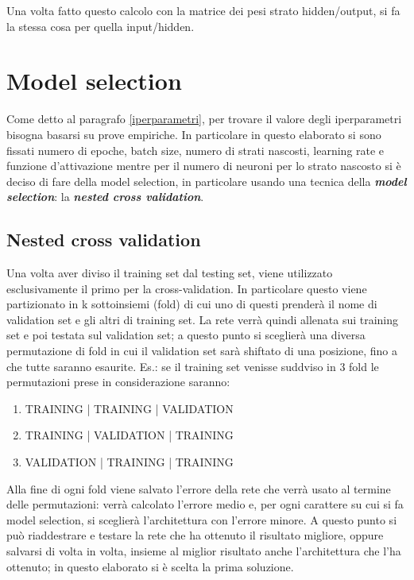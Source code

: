 \documentclass[12pt]{report}
\begin{document}
Una volta fatto questo calcolo con la matrice dei pesi strato hidden/output, si fa la stessa cosa per quella input/hidden.


\section{Model selection}
Come detto al paragrafo \ref{iperparametri}, per trovare il valore degli iperparametri bisogna basarsi su prove empiriche. In particolare in questo elaborato si sono fissati numero di epoche, batch size, numero di strati nascosti, learning rate e funzione d'attivazione mentre per il numero di neuroni per lo strato nascosto si è deciso di fare della model selection, in particolare usando una tecnica della \textbf{\textit{model selection}}: la \textbf{\textit{nested cross validation}}.

\subsection{Nested cross validation}
Una volta aver diviso il training set dal testing set, viene utilizzato esclusivamente  il primo per la cross-validation. In particolare questo viene partizionato in k sottoinsiemi (fold) di cui uno di questi prenderà il nome di validation set e gli altri di training set. La rete verrà quindi allenata sui training set e poi testata sul validation set; a questo punto si sceglierà una diversa permutazione di fold in cui il validation set sarà shiftato di una posizione, fino a che tutte saranno esaurite. 
Es.: se il training set venisse suddviso in 3 fold le permutazioni prese in considerazione saranno:
\begin{enumerate}
\item{TRAINING | TRAINING | VALIDATION}
\item{TRAINING | VALIDATION | TRAINING}
\item{VALIDATION | TRAINING | TRAINING}
\end{enumerate}

Alla fine di ogni fold viene salvato l’errore della rete che verrà usato al termine delle permutazioni: verrà calcolato l’errore medio e, per ogni carattere su cui si fa model selection, si sceglierà l’architettura con l’errore minore. A questo punto si può riaddestrare e testare la rete che ha ottenuto il risultato migliore, oppure salvarsi di volta in volta, insieme al miglior risultato anche l’architettura che l’ha ottenuto; in questo elaborato si è scelta la prima soluzione.
\end{document}
